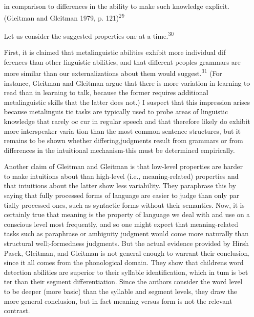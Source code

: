 \begin{styleStandard}
in comparison to differences in the ability to make such knowledge explicit. (Gleitman and Gleitman 1979, p. 121)\textsuperscript{29}
\end{styleStandard}


\begin{styleStandard}
Let us consider the suggested properties one at a time.\textsuperscript{30}
\end{styleStandard}


\begin{styleStandard}
First, it is claimed that metalinguistic abilities exhibit more individual dif\- ferences than other linguistic abilities, and that different people{\textquotesingle}s grammars are more similar than our externalizations about them would suggest.\textsuperscript{31}\textsuperscript{ }(For instance, Gleitman and Gleitman argue that there is more variation in learning to read than in learning to talk, because the former requires additional metalinguistic skills that the latter does not.) I suspect that this impression arises because metalinguis\- tic tasks are typically used to probe areas of linguistic knowledge that rarely oc\- cur in regular speech and that therefore likely do exhibit more interspeaker varia\- tion than the most common sentence structures, but it remains to be shown whether differing,judgments result from grammars or from differences in the intuitional mechanism{}-this must be determined empirically.
\end{styleStandard}


\begin{styleStandard}
Another claim of Gleitman and Gleitman is that low-level properties are harder to make intuitions about than high-level (i.e., meaning-related) properties and that intuitions about the latter show less variability. They paraphrase this by saying that {\textquotedbl}fully processed{\textquotedbl} forms of language are easier to judge than only par\- tially processed ones, such as syntactic forms without their semantics. Now, it is certainly true that meaning is the property of language we deal with and use on a conscious level most frequently, and so one might expect that meaning-related tasks such as paraphrase or ambiguity judgment would come more naturally than structural well;-formedness judgments. But the actual evidence provided by Hirsh\- Pasek, Gleitman, and Gleitman is not general enough to warrant their conclusion, since it all comes from the phonological domain. They show that children{\textquotesingle}s word detection abilities are superior to their syllable identification, which in tum is bet\- ter than their segment differentiation. Since the authors consider the word level to be {\textquotedbl}deeper{\textquotedbl} (more basic) than the syllable and segment levels, they draw the more general conclusion, but in fact meaning versus form is not the relevant contrast.
\end{styleStandard}


